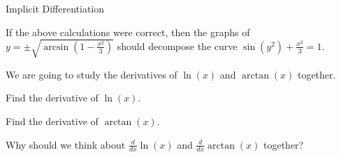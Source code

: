\documentclass[../main.tex]{subfiles}
\begin{document}
\begin{lesson}{Implicit Differentiation}
\begin{example}
      If the above calculations were correct, then the graphs of \(y = \pm \sqrt{\arcsin\left(1 - \frac{x^{2}}{3}\right)}\) should decompose the curve \(\sin(y^{2}) + \frac{x^{2}}{3} = 1\).
    \end{example}


    \clearpage

    We are going to study the derivatives of \(\ln(x)\) and \(\arctan(x)\) together. 

    \begin{example}
      Find the derivative of \(\ln(x)\).  
    \end{example}

    \begin{example}
      Find the derivative of \(\arctan(x)\).
    \end{example}

    \faComment{} Why should we think about \texorpdfstring{\(\frac{d}{dx}\ln(x)\)}{ln'(x)} and \texorpdfstring{\(\frac{d}{dx}\arctan(x)\)}{arctan'(x)} together?

  \end{lesson}
\end{document}
